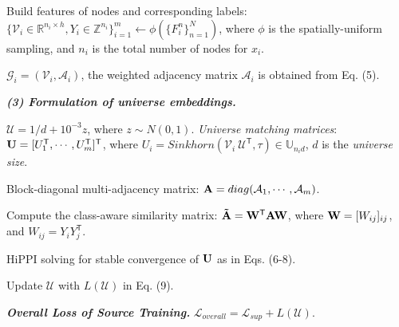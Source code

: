 \begin{algorithm*}
\begin{algorithmic}[1]
            \STATE Build features of nodes and corresponding labels: $\{\mathcal{V}_i \in \mathbb{R}^{n_i \times h}, {Y}_i \in \mathbb{Z}^{n_i}\}_{i=1}^m \leftarrow \phi(\{F_i^n\}_{n=1}^N)$, where $\phi$ is the spatially-uniform sampling, and $n_i$ is the total number of nodes for $x_i$. 

            \STATE $ \mathcal{G}_i = (\mathcal{V}_i, \mathcal{A}_i)$, the weighted adjacency matrix $\mathcal{A}_i$ is obtained from Eq. (5).
        \ENDFOR

        \textit{\textbf{(3) Formulation of \textit{universe embeddings}.}}

        \STATE $\mathcal{U} = 1/d + 10^{-3}z$, where $z \sim N(0, 1)$.
        \ENDIF
        \STATE \textit{Universe matching matrices}: $\bold{U} = [U_1^{\mathsf{T}}, \cdots, U_m^{\mathsf{T}}]^{\mathsf{T}}$, where $U_i = Sinkhorn(\mathcal{V}_i \ \mathcal{U}^{\mathsf{T}}, \tau) \in \mathbb{U}_{n_i d}$, $d$ is the \textit{universe size}.

        \STATE Block-diagonal multi-adjacency matrix: $\bold{A} = diag(\mathcal{A}_1, \cdots, \mathcal{A}_m)$. 

        \STATE Compute the class-aware similarity matrix: $\bold{\tilde{A}} = \bold{W}^{\mathsf{T}} \bold{A}\bold{W}$, where $\bold{W} = [W_{ij}]_{ij}$, and $W_{ij} = {Y}_i {Y}_j^{\mathsf{T}}$. 

        \STATE HiPPI solving for stable convergence of $\bold{U}$ as in Eqs. (6-8).

        \STATE Update $\mathcal{U}$ with $L(\mathcal{U})$ in Eq. (9).

        \textit{\textbf{Overall Loss of Source Training.}}
        \STATE $\mathcal{L}_{overall}=\mathcal{L}_{sup}+L(\mathcal{U})$.

    \end{algorithmic}
    \label{algo:train}
\end{algorithm*}
% 

